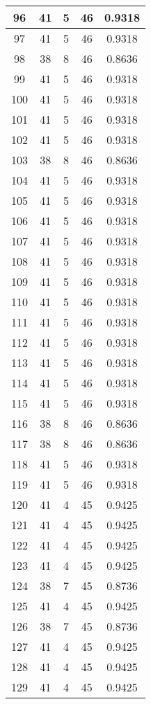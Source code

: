 \documentclass[letterpaper, 12pt]{article}
\begin{document}
\begin{longtable}{|c|c|c|c|c|}
\hline
96 & 41 & 5 & 46 & 0.9318 \\
\hline
97 & 41 & 5 & 46 & 0.9318 \\
\hline
98 & 38 & 8 & 46 & 0.8636 \\
\hline
99 & 41 & 5 & 46 & 0.9318 \\
\hline
100 & 41 & 5 & 46 & 0.9318 \\
\hline
101 & 41 & 5 & 46 & 0.9318 \\
\hline
102 & 41 & 5 & 46 & 0.9318 \\
\hline
103 & 38 & 8 & 46 & 0.8636 \\
\hline
104 & 41 & 5 & 46 & 0.9318 \\
\hline
105 & 41 & 5 & 46 & 0.9318 \\
\hline
106 & 41 & 5 & 46 & 0.9318 \\
\hline
107 & 41 & 5 & 46 & 0.9318 \\
\hline
108 & 41 & 5 & 46 & 0.9318 \\
\hline
109 & 41 & 5 & 46 & 0.9318 \\
\hline
110 & 41 & 5 & 46 & 0.9318 \\
\hline
111 & 41 & 5 & 46 & 0.9318 \\
\hline
112 & 41 & 5 & 46 & 0.9318 \\
\hline
113 & 41 & 5 & 46 & 0.9318 \\
\hline
114 & 41 & 5 & 46 & 0.9318 \\
\hline
115 & 41 & 5 & 46 & 0.9318 \\
\hline
116 & 38 & 8 & 46 & 0.8636 \\
\hline
117 & 38 & 8 & 46 & 0.8636 \\
\hline
118 & 41 & 5 & 46 & 0.9318 \\
\hline
119 & 41 & 5 & 46 & 0.9318 \\
\hline
120 & 41 & 4 & 45 & 0.9425 \\
\hline
121 & 41 & 4 & 45 & 0.9425 \\
\hline
122 & 41 & 4 & 45 & 0.9425 \\
\hline
123 & 41 & 4 & 45 & 0.9425 \\
\hline
124 & 38 & 7 & 45 & 0.8736 \\
\hline
125 & 41 & 4 & 45 & 0.9425 \\
\hline
126 & 38 & 7 & 45 & 0.8736 \\
\hline
127 & 41 & 4 & 45 & 0.9425 \\
\hline
128 & 41 & 4 & 45 & 0.9425 \\
\hline
129 & 41 & 4 & 45 & 0.9425 \\

\end{longtable}
\end{document}
